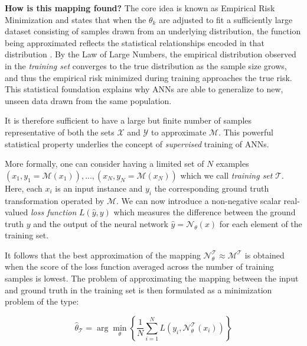 \textbf{How is this mapping found?} The core idea is known as Empirical Risk Minimization and states that 
when the $\theta_k$ are adjusted to fit a sufficiently large dataset consisting of samples drawn from an underlying distribution, 
the function being approximated reflects the statistical relationships encoded in that distribution \cite{Hornik_1990}.
By the Law of Large Numbers, the empirical distribution observed in the \textit{training set} converges to the true 
distribution as the sample size grows, and thus the empirical risk minimized during training approaches the true 
risk. This statistical foundation explains why ANNs are able to generalize to new, unseen data drawn from the 
same population. 

It is therefore sufficient to have a large but finite number of samples representative of both the sets $\mathcal{X}$ 
and $\mathcal{Y}$ to approximate $\mathcal{M}$. This powerful statistical property underlies the concept of \textit{supervised} 
training of ANNs. 

More formally, one can consider having a limited set of $N$ examples $(x_1,y_1 = \mathcal{M}(x_1)), ..., (x_N, y_N = \mathcal{M}(x_N))$ 
which we call \textit{training set} $\mathcal{T}$. Here, each $x_i$ is an input instance and $y_i$ the 
corresponding ground truth transformation operated by $\mathcal{M}$. We can now introduce a non-negative scalar 
real-valued \textit{loss function} $L(\hat{y},y )$ which measures the difference between the ground truth $y$ and the 
output of the neural network $\hat{y} = \mathcal{N}_\theta (x)$ for each element of the training set.

It follows that the best approximation of the mapping $ \mathcal{N}_\theta^{\mathcal{T}} \approx \mathcal{M}^{\mathcal{T}}$ is 
obtained when the score of the loss function averaged across the number of training samples is lowest.
The problem of approximating the mapping between the input and ground truth in the training set is then formulated as 
a minimization problem of the type: 

\begin{equation}
    \hat{\theta}_{\mathcal T}
    = \arg\min_{\theta} 
    \left\{ \frac{1}{N} \sum_{i=1}^N 
    L\!\left(y_i, \mathcal{N}_{\theta}^{\mathcal{T}}(x_i)\right) 
    \right\}
\end{equation}

